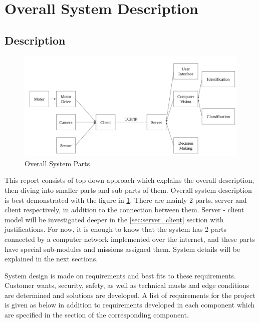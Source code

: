 \section{Overall System Description}
\label{sec:overall_system_description}


\subsection{Description}

\begin{figure}[h]
    \centering
    \includegraphics[width=\linewidth]{content/020_overall_design/img/overall_diagram.png}
    \caption{Overall System Parts}
    \label{fig:overall_system_parts}
\end{figure}


This report consists of top down approach which explains the overall description, then diving into smaller parts and sub-parts of them. Overall system description is best demonstrated with the figure in \ref{fig:overall_system_parts}. There are mainly 2 parts, server and client respectively, in addition to the connection between them. Server - client model will be investigated deeper in the \ref{sec:server_client} section with justifications. For now, it is enough to know that the system has 2 parts connected by a computer network implemented over the internet, and these parts have special sub-modules and missions assigned them. System details will be explained in the next sections.

System design is made on requirements and best fits to these requirements. Customer wants, security, safety, as well as technical musts and edge conditions are determined and solutions are developed. A list of requirements for the project is given as below in addition to requirements developed in each component which are specified in the section of the corresponding component.

